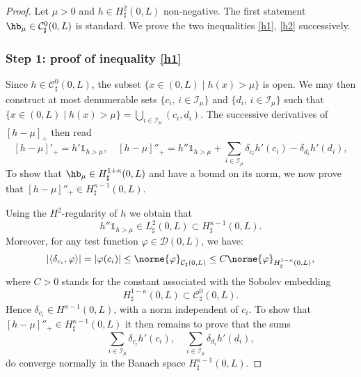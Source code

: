 \begin{proof}Let $\mu>0$ and $h \in H^{2}_{\sharp}(0,L)$ non-negative. The first statement $\hb_{\mu}\in \mathcal{C}_\sharp^{0}(0,L)$ is standard. We prove the two inequalities \eqref{h1}, \eqref{h2} successively.

\subsubsection*{Step 1: proof of inequality \eqref{h1}}
Since $h \!\in\!{\mathcal C}^0_{\sharp}(0,L)$, the subset \hbox{$\{x\!\in\!(0, L)\mid h(x)\!>\!\mu\}$} is open.
We may then construct at most denumerable sets $\{c_i, \, i\!\in\!\mathcal I_{\mu}\}$ and \hbox{$\{ d_i, \, i\!\in\!\mathcal I_{\mu}\}$} such that $\{x\!\in\!(0, L)\mid h(x)\!>\!\mu\}\!=\! \bigcup_{i\in\mathcal I_{\mu}}(c_{i},d_{i})$. The successive derivatives of $[h-\mu]_{+}$ then read
\[
[h-\mu]'_{+}= h'\mathds{1}_{h>\mu}, \quad [h-\mu]{''}_{+}= h{''}\mathds{1}_{h>\mu}+\sum_{i\in \mathcal I_{\mu}}\delta_{c_{i} }h{'}(c_{i})- \delta_{d_{i}}h'(d_{i}),
\]
To show that $\hb_{\mu} \in H^{1+\kappa}_{\sharp}(0,L)$ and have a bound on its norm, we now prove that
$[h- {\mu}]{''}_{+} \in H^{\kappa-1}_{\sharp}(0,L)$.

Using the $H^{2}$-regularity of $h$ we obtain that
\[
h{''}\mathds{1}_{h>\mu} \in L_\sharp^{2}(0,L) \subset H^{\kappa-1}_{\sharp}(0,L).
\]
Moreover, for any test function $\varphi \in \mathcal{D}(0, L)$, we have:
\[
\vert\langle \delta_{c_{i}},\varphi\rangle\vert = \vert \varphi(c_{i})\vert\leq \norme{\varphi}_{\mathcal{C}_\sharp(0,L)}\leq C\norme{\varphi}_{H_\sharp^{1-\kappa}(0,L)},
\]
where $C>0$ stands for the constant associated with the Sobolev embedding
\[
H_\sharp^{1-\kappa}(0,L) \subset \mathcal{C}^0_\sharp(0,L).
\]
Hence $\delta_{c_{i}} \in H^{\kappa-1}(0,L)$, with a norm independent of $c_{i}$. To show that $[h- {\mu}]{''}_{+} \in H^{\kappa-1}_{\sharp}(0,L)$ it then remains to prove that the sums
\[
\sum_{i\in \mathcal I_{\mu}}\delta_{c_{i} }h{'}(c_{i}), \quad \sum_{i\in \mathcal I_{\mu}}\delta_{d_{i} }h{'}(d_{i}),
\]
do converge normally in the Banach space $H_\sharp^{\kappa-1}(0,L)$.


\end{proof}
